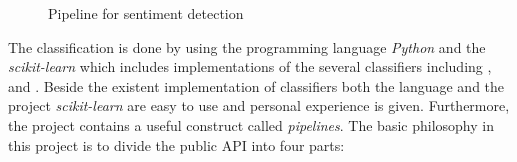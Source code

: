 \begin{figure}[hbt]
  \centering

  \caption{Pipeline for sentiment detection}
  \label{fig:casestudy-sentimentpipeline}
\end{figure}


The classification is done by using the programming language \emph{Python} and the \emph{scikit-learn} which includes implementations of the several classifiers including \nb{}, \me{} and \svm{}.
Beside the existent implementation of classifiers both the language and the project \emph{scikit-learn} are easy to use and personal experience is given.
Furthermore, the project contains a useful construct called \emph{pipelines}.
The basic philosophy in this project is to divide the public \ac{API} into four parts:

